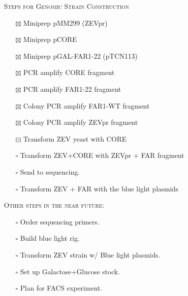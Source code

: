 \documentclass{beamer}
\begin{document}
\begin{frame}
    \begin{center}
        {\large \textsc{Steps for Genomic Strain Construction}}
    \end{center}
        \begin{itemize}
            \item[$\boxtimes$]  Miniprep pMM299 (ZEVpr)
            \item[$\boxtimes$]  Miniprep pCORE
            \item[$\boxtimes$]  Miniprep pGAL-FAR1-22 (pTCN113)
            \item[$\boxtimes$]  PCR amplify CORE fragment
            \item[$\boxtimes$]  PCR amplify FAR1-22 fragment
            \item[$\boxtimes$]  Colony PCR amplify FAR1-WT fragment
            \item[$\boxtimes$]  Colony PCR amplify ZEVpr fragment
            \item[$\boxminus$]  Transform ZEV yeast with CORE
            \item[$\square$] Transform ZEV+CORE with ZEVpr + FAR fragment
            \item[$\square$] Send to sequencing.
            \item[$\square$] Transform ZEV + FAR with the blue light plasmids
        \end{itemize}
\end{frame}

\begin{frame}
    \begin{center}
        {\large \textsc{Other steps in the near future:}}
    \end{center}
        \begin{itemize}
            \item[$\square$] Order sequencing primers.
            \item[$\square$] Build blue light rig.
            \item[$\square$] Transform ZEV strain w/ Blue light plasmids.
            \item[$\square$] Set up Galactose+Glucose stock.
            \item[$\square$] Plan for FACS experiment.
        \end{itemize}
\end{frame}
\end{document}
